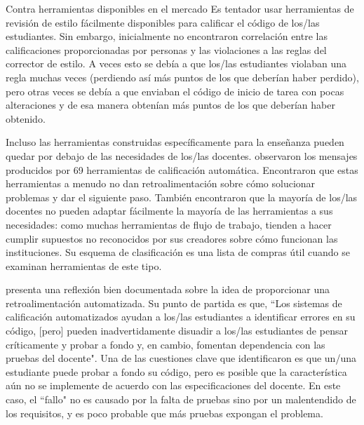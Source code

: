 \begin{aside}{Contra herramientas disponibles en el mercado}
Es tentador usar herramientas de revisión de estilo fácilmente disponibles para calificar el código de los/las estudiantes.
Sin embargo,
\cite{Nutb2016} inicialmente no encontraron correlación entre las calificaciones proporcionadas por personas 
y las violaciones a las reglas del corrector de estilo.
A veces esto se debía a que los/las estudiantes violaban una regla muchas veces 
(perdiendo así más puntos de los que deberían haber perdido), 
pero otras veces se debía a que enviaban el código de inicio de tarea con pocas alteraciones y de esa manera obtenían más puntos de los que deberían haber obtenido.

 Incluso las herramientas construidas específicamente para la enseñanza pueden quedar por debajo de las necesidades de los/las docentes.
   \cite{Keun2016a,Keun2016b}  observaron los mensajes producidos por 69 herramientas de calificación automática.
  Encontraron que estas herramientas a menudo no dan retroalimentación sobre cómo solucionar problemas y dar el siguiente paso.
    También encontraron que la mayoría de los/las docentes no pueden adaptar fácilmente la mayoría de las herramientas a sus necesidades: 
como muchas herramientas de flujo de trabajo, tienden a hacer cumplir supuestos no reconocidos por sus creadores sobre cómo funcionan las instituciones.
  Su esquema de clasificación es una lista de compras útil cuando se examinan herramientas de este tipo.
\end{aside}

\cite{Buff2015} presenta una reflexión bien documentada sobre la idea de proporcionar una retroalimentación automatizada.
Su punto de partida es que, 
``Los sistemas de calificación automatizados ayudan a los/las estudiantes a identificar errores en su código, 
[pero] pueden inadvertidamente disuadir a los/las estudiantes de pensar críticamente y probar a fondo y, en cambio,  
fomentan dependencia con las pruebas del docente".
Una de las cuestiones clave que identificaron es que un/una estudiante puede probar a fondo su código, pero es posible que la característica aún no se implemente de acuerdo con las especificaciones del docente.
En este caso, 
el ``fallo" no es causado por la falta de pruebas sino por un malentendido de los requisitos, y es poco probable que más pruebas expongan el problema.

